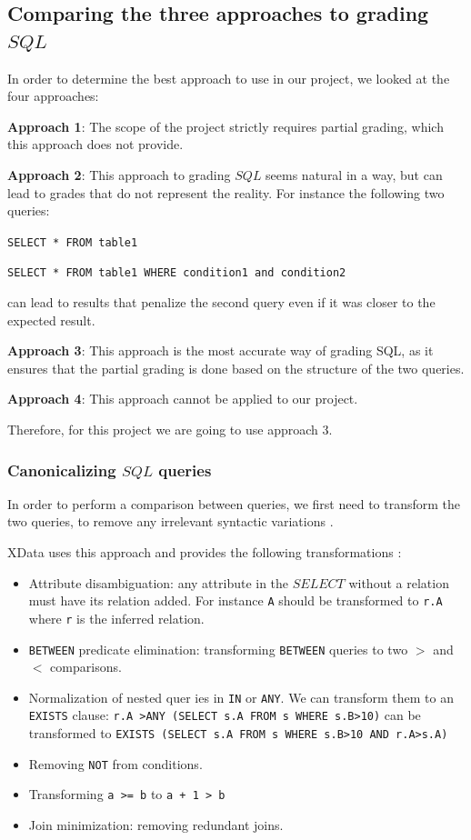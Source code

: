 \subsection{Comparing the three approaches to grading $SQL$}
In order to determine the best approach to use in our project, we looked at
the four approaches:

\textbf{Approach 1}: The scope of the project strictly requires partial grading,
which this approach does not provide.

\textbf{Approach 2}: This approach to grading $SQL$ seems natural in a way, but
can lead to grades that do not represent the reality. For instance the following
two queries:
\begin{center}
    \texttt{SELECT * FROM table1}

    \texttt{SELECT * FROM table1 WHERE condition1 and condition2}
\end{center}
can lead to results that penalize the second query even if it was closer to the
expected result.

\textbf{Approach 3}: This approach is the most accurate way of grading SQL, as
it ensures that the partial grading is done based on the structure of the two
queries.

\textbf{Approach 4}: This approach cannot be applied to our project.

Therefore, for this project we are going to use approach 3.

\subsubsection{Canonicalizing $SQL$ queries}
In order to perform a comparison between queries, we first need to transform the
two queries, to remove any irrelevant syntactic variations
\cite{literature:xdata}.

XData uses this approach and provides the following transformations \cite{literature:xdata}:
\begin{itemize}
    \item Attribute disambiguation: any attribute in the $SELECT$ without a
    relation must have its relation added. For instance \texttt{A} should be
    transformed to \texttt{r.A} where \texttt{r} is the inferred relation.
    \item \texttt{BETWEEN} predicate elimination: transforming \texttt{BETWEEN} queries to
    two $>$ and $<$ comparisons.
    \item Normalization of nested quer ies in \texttt{IN} or \texttt{ANY}. We
    can transform them to an \texttt{EXISTS} clause:
    \texttt{r.A >ANY (SELECT s.A FROM s WHERE s.B>10)} can be transformed to
    \texttt{EXISTS (SELECT s.A FROM s WHERE s.B>10 AND r.A>s.A)}
    \item Removing \texttt{NOT} from conditions.
    \item Transforming \texttt{a >= b} to \texttt{a + 1 > b}
    \item Join minimization: removing redundant joins.
\end{itemize}

